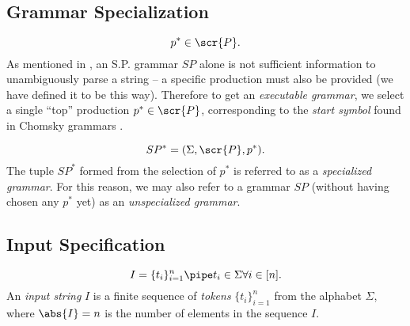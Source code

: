 \documentclass[10pt]{article}
\newcommand{\generalsubseq}{\overbar{I}}
\begin{document}
\subsection{Grammar Specialization}
\label{sec:grammar-specialization}
\begin{equation}
  \label{eq:p-top}
  p^* \in \scr{P}.
\end{equation}
As mentioned in , an S.P. grammar $SP$ alone is not sufficient information to unambiguously parse a string -- a specific production must also be provided (we have defined it to be this way). Therefore to get an \textit{executable grammar}, we select a single ``top'' production $p^* \in \scr{P}$, corresponding to the \textit{start symbol} found in Chomsky grammars .

\begin{equation}
  \label{eq:specialized}
  SP^* = (\Sigma, \scr{P}, p^*).
\end{equation}
The tuple $SP^*$ formed from the selection of $p^*$ is referred to as a \textit{specialized grammar}. For this reason, we may also refer to a grammar $SP$ (without having chosen any $p^*$ yet) as an \textit{unspecialized grammar}.

\subsection{Input Specification}
\label{sec:input-specification}
\begin{equation}
  \label{eq:input-string-tokens}
  I = \{t_i\}_{i=1}^n \pipe t_i \in \Sigma \forall i \in [n].
\end{equation}
An \textit{input string} $I$ is a finite sequence of \textit{tokens} $\{t_i\}_{i=1}^n$ from the alphabet $\Sigma$, where $\abs{I} = n$ is the number of elements in the sequence $I$.

\end{document}
